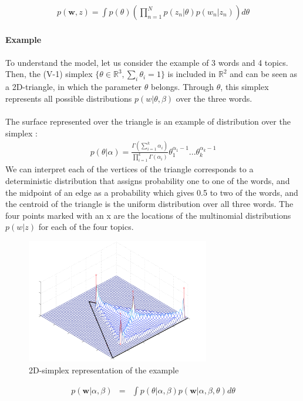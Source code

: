 \documentclass[12pt]{article}
\begin{document}
\begin{eqnarray*}
p(\textbf{w},z)=\int p(\theta)(\prod_{n=1}^{N}p(z_{n} | \theta)p(w_{n}|z_{n}))d\theta
\end{eqnarray*}
~\\
\textbf{Example}~\\
~\\
To understand the model, let us consider the example of 3 words and 4 topics.
Then, the (V-1) simplex $\{\theta \in \mathbb{R}^{3}, \sum_{i}\theta_{i}=1\}$  is included in $\mathbb{R}^{2}$ and can be seen as a 2D-triangle, in which the parameter $\theta$ belongs. Through $\theta$, this simplex represents all possible distributions $p(w|\theta,\beta)$ over the three words.~\\
~\\
The surface represented over the triangle is an example of distribution over the simplex :
\begin{eqnarray*}
p(\theta | \alpha)=\frac{\Gamma(\sum_{i=1}^{k}\alpha_{i})}{\prod_{i=1}^{k}\Gamma(\alpha_{i})}\theta_{1}^{\alpha_{1}-1}...\theta_{k}^{\alpha_{k}-1}
\end{eqnarray*}
We can interpret each of the vertices of the triangle corresponds to a deterministic distribution that assigns probability one to one of the words, and the midpoint of an edge as a probability which gives 0.5 to two of the words, and the centroid of the triangle is the uniform distribution over all three words. The four points marked with an x are the locations of the multinomial distributions $p(w | z)$ for each of the four topics.
\begin{figure}[!H]
\centering
\includegraphics[width=8cm]{Simplex}
\caption{2D-simplex representation of the example}
\end{figure}
\begin{eqnarray*}
p(\textbf{w}|\alpha, \beta) &  = & \int p(\theta | \alpha, \beta)p(\textbf{w} | \alpha, \beta, \theta)d\theta\\
\end{eqnarray*}
\end{document}
